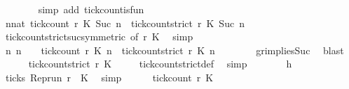 \begin{isabellebody}
\ \ \ \ \ \ \isamarkupfalse%
\ {\isacharparenleft}simp\ add{\isacharcolon}\ tick{\isacharunderscore}count{\isacharunderscore}is{\isacharunderscore}fun{\isacharparenright}\ \isanewline
\ \ \ \ \isamarkupfalse%
\ {\isacartoucheopen}{\isasymforall}n{\isacharcolon}{\isacharcolon}nat{\isachardot}\ {\isacharparenleft}tick{\isacharunderscore}count\ r\ K\ {\isacharparenleft}Suc\ n{\isacharparenright}{\isacharparenright}\ {\isasymle}\ {\isacharparenleft}tick{\isacharunderscore}count{\isacharunderscore}strict\ r\ K\ {\isacharparenleft}Suc\ n{\isacharparenright}{\isacharparenright}{\isacartoucheclose}\isanewline
\ \ \ \ \ \ \isamarkupfalse%
\ tick{\isacharunderscore}count{\isacharunderscore}strict{\isacharunderscore}suc{\isacharbrackleft}symmetric{\isacharcomma}\ of\ {\isacartoucheopen}r{\isacartoucheclose}\ {\isacartoucheopen}K\ \isamarkupfalse%
\ simp\isanewline
\ \ \ \ \isamarkupfalse%
\ {\isacharasterisk}{\isacharcolon}{\isacartoucheopen}{\isasymforall}n{\isachardot}\ n\ {\isachargreater}\ {}\ {\isasymlongrightarrow}\ {\isacharparenleft}tick{\isacharunderscore}count\ r\ K\ n{\isacharparenright}\ {\isasymle}\ {\isacharparenleft}tick{\isacharunderscore}count{\isacharunderscore}strict\ r\ K\ n{\isacharparenright}{\isacartoucheclose}\isanewline
\ \ \ \ \ \ \isamarkupfalse%
\ gr{}{\isacharunderscore}implies{\isacharunderscore}Suc\ \isamarkupfalse%
\ blast\isanewline
\ \ \ \ \isamarkupfalse%
\ {\isacartoucheopen}tick{\isacharunderscore}count{\isacharunderscore}strict\ r\ K\ {}\ {\isacharequal}\ {}{\isacartoucheclose}\ \isamarkupfalse%
\ tick{\isacharunderscore}count{\isacharunderscore}strict{\isacharunderscore}def\ \isamarkupfalse%
\ simp\isanewline
\ \ \ \ \isamarkupfalse%
\ \isamarkupfalse%
\ h\ \isamarkupfalse%
\ {\isacartoucheopen}{\isasymnot}ticks\ {\isacharparenleft}{\isacharparenleft}Rep{\isacharunderscore}run\ r{\isacharparenright}\ {}\ K\ \isamarkupfalse%
\ simp\isanewline
\ \ \ \ \isamarkupfalse%
\ {\isacartoucheopen}tick{\isacharunderscore}count\ r\ K\ {}\ {\isacharequal}\ {}{\isacartoucheclose}\ \isamarkupfalse%

\end{isabellebody}
